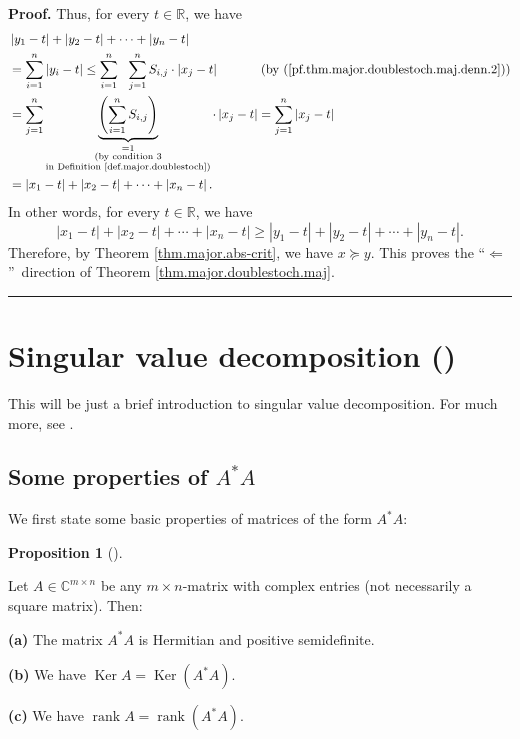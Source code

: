 \documentclass[numbers=enddot,12pt,final,onecolumn,notitlepage]{scrartcl}%
\numberwithin{exer}{subsection}
\theoremstyle{definition}
\newtheorem{prop}[theo]{Proposition}
\newenvironment{proposition}[1][]
{\begin{prop}[#1]\begin{leftbar}}
{\end{leftbar}\end{prop}}
\newenvironment{proof}[1][Proof]{\noindent\textbf{#1.} }{\ \rule{0.5em}{0.5em}}
\let\sumnonlimits\sum
\renewcommand{\sum}{\sumnonlimits\limits}
\begin{document}
\begin{proof}
Thus, for every $t\in\mathbb{R}$, we have%
\begin{align*}
&  \left\vert y_{1}-t\right\vert +\left\vert y_{2}-t\right\vert +\cdots
+\left\vert y_{n}-t\right\vert \\
&  =\sum_{i=1}^{n}\left\vert y_{i}-t\right\vert \leq\sum_{i=1}^{n}%
\ \ \sum_{j=1}^{n}S_{i,j}\cdot\left\vert x_{j}-t\right\vert
\ \ \ \ \ \ \ \ \ \ \left(  \text{by
(\ref{pf.thm.major.doublestoch.maj.denn.2})}\right) \\
&  =\sum_{j=1}^{n}\underbrace{\left(  \sum_{i=1}^{n}S_{i,j}\right)
}_{\substack{=1\\\text{(by condition 3}\\\text{in Definition
\ref{def.major.doublestoch})}}}\cdot\left\vert x_{j}-t\right\vert =\sum
_{j=1}^{n}\left\vert x_{j}-t\right\vert \\
&  =\left\vert x_{1}-t\right\vert +\left\vert x_{2}-t\right\vert
+\cdots+\left\vert x_{n}-t\right\vert .
\end{align*}
In other words, for every $t\in\mathbb{R}$, we have%
\[
\left\vert x_{1}-t\right\vert +\left\vert x_{2}-t\right\vert +\cdots
+\left\vert x_{n}-t\right\vert \geq\left\vert y_{1}-t\right\vert +\left\vert
y_{2}-t\right\vert +\cdots+\left\vert y_{n}-t\right\vert .
\]
Therefore, by Theorem \ref{thm.major.abs-crit}, we have $x\succcurlyeq y$.
This proves the \textquotedblleft$\Longleftarrow$\textquotedblright\ direction
of Theorem \ref{thm.major.doublestoch.maj}.
\end{proof}

\section{Singular value decomposition (\cite[\S 2.6]{HorJoh13})}

This will be just a brief introduction to singular value decomposition. For
much more, see \cite{TreBau97}.

\subsection{Some properties of $A^{\ast}A$}

We first state some basic properties of matrices of the form $A^{\ast}A$:

\begin{proposition}
[the $\operatorname*{Ker}\left(  A^{\ast}A\right)  $ lemma]%
\label{prop.SVD.A*A}Let $A\in\mathbb{C}^{m\times n}$ be any $m\times n$-matrix
with complex entries (not necessarily a square matrix). Then: \medskip

\textbf{(a)} The matrix $A^{\ast}A$ is Hermitian and positive semidefinite.
\medskip

\textbf{(b)} We have $\operatorname*{Ker}A=\operatorname*{Ker}\left(  A^{\ast
}A\right)  $. \medskip

\textbf{(c)} We have $\operatorname*{rank}A=\operatorname*{rank}\left(
A^{\ast}A\right)  $.
\end{proposition}
\end{document}
